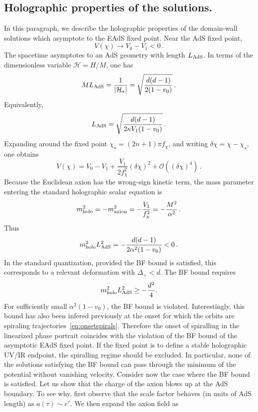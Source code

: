 \documentclass[a4paper]{article}
\begin{document}
\subsection{Holographic properties of the solutions.}
In this paragraph, we describe the holographic properties of the domain-wall solutions which
asymptote to the EAdS fixed point. Near the AdS fixed point,
\begin{equation}
  V(\chi)\to V_0-V_1<0\,.
\end{equation}
The spacetime asymptotes to an AdS geometry with length $L_{\rm AdS}$. In terms of the
dimensionless variable $\mathcal H=H/M$, one has
\begin{equation}
  M L_{\rm AdS}
  =
  \frac{1}{|\mathcal H_\star|}
  =
  \sqrt{\frac{d(d-1)}{2(1-v_0)}}\,.
\end{equation}
Equivalently,
\begin{equation}
  L_{\rm AdS}
  =
  \sqrt{
  \frac{d(d-1)}
  {2\kappa V_1(1-v_0)}
  }\,.
\end{equation}
Expanding around the fixed point
$\chi_\star=(2n+1)\pi f_\chi$, and writing
$\delta\chi=\chi-\chi_\star$, one obtains
\begin{equation}
  V(\chi)
  =
  V_0-V_1
  +
  \frac{V_1}{2f_\chi^2}(\delta\chi)^2
  +
  \mathcal O((\delta\chi)^4)\,.
\end{equation}
Because the Euclidean axion has the wrong-sign kinetic term, the mass parameter entering the
standard holographic scalar equation is
\begin{equation}
  m_{\rm holo}^2
  =
  -m_{\rm axion}^2
  =
  -\frac{V_1}{f_\chi^2}
  =
  -\frac{M^2}{\alpha^2}\,.
\end{equation}
Thus
\begin{equation}
  m_{\rm holo}^2L_{\rm AdS}^2
  =
  -
  \frac{d(d-1)}{2\alpha^2(1-v_0)}
  <0\,.
\end{equation}
In the standard quantization, provided the BF bound is satisfied, this corresponds to a relevant
deformation with $\Delta_+<d$. The BF bound requires
\begin{equation}
  m_{\rm holo}^2L_{\rm AdS}^2\geq -\frac{d^2}{4}.
\end{equation}
For sufficiently small $\alpha^2(1-v_0)$, the BF bound is violated. Interestingly, this bound has also been infered previously at the onset for which the orbits are spiraling trajectories~\eqref{eq:onsetspirals}. Therefore the onset of spiralling in the linearized phase portrait coincides with the violation of the BF bound of the asymptotic EAdS fixed point. If the fixed point is to define a stable holographic UV/IR endpoint, the spiralling regime should be excluded. In particular, none of the solutions satisfying the BF bound can pass through the minimum of the potential without vanishing velocity. Consider now the case where the BF bound is satisfied. Let us show that the charge of the axion blows up at the AdS boundary. To see why, first observe that the scale factor behaves (in units of AdS length) as $a(\tau)\sim e^{\tau}$. We then expand the axion field as
\end{document}
